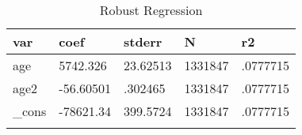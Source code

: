 \documentclass{article}
\begin{document}
\begin{table}[tbp] \centering
{}

\caption{Robust Regression}
\begin{tabularx}{\textwidth}{lCCCC}

\toprule
{var}&{coef}&{stderr}&{N}&{r2} \tabularnewline
\midrule\addlinespace[1.5ex]
age&5742.326&23.62513&1331847&.0777715 \tabularnewline
age2&-56.60501&.302465&1331847&.0777715 \tabularnewline
\_cons&-78621.34&399.5724&1331847&.0777715 \tabularnewline
\bottomrule \addlinespace[1.5ex]

\end{tabularx}
\end{table}
\end{document}
